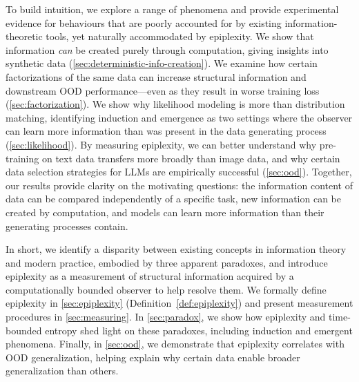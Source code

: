 \documentclass[twoside]{article}
\begin{document}
To build intuition, we explore a range of phenomena and provide experimental evidence for behaviours that are poorly accounted for by existing information-theoretic tools, yet naturally accommodated by epiplexity. We show that information \emph{can} be created purely through computation, giving insights into synthetic data (\autoref{sec:deterministic-info-creation}). We examine how certain factorizations of the same data can increase structural information and downstream OOD performance—even as they result in worse training loss (\autoref{sec:factorization}). We show why likelihood modeling is more than distribution matching, identifying induction and emergence as two settings where the observer can learn more information than was present in the data generating process (\autoref{sec:likelihood}). By measuring epiplexity, we can better understand why pre-training on text data transfers more broadly than image data, and why certain data selection strategies for LLMs are empirically successful (\autoref{sec:ood}). Together, our results provide clarity on the motivating questions: the information content of data can be compared independently of a specific task, new information can be created by computation, and models can learn more information than their generating processes contain.

%
%
%

In short, we identify a disparity between existing concepts in information theory and modern practice, embodied by three apparent paradoxes, and introduce epiplexity as a measurement of structural information acquired by a computationally bounded observer to help resolve them. We formally define epiplexity in \autoref{sec:epiplexity} (Definition~\ref{def:epiplexity}) and present measurement procedures in \autoref{sec:measuring}. In \autoref{sec:paradox}, we show how epiplexity and time-bounded entropy shed light on these paradoxes, including induction and emergent phenomena. Finally, in \autoref{sec:ood}, we demonstrate that epiplexity correlates with OOD generalization, helping explain why certain data enable broader generalization than others.

%

%

%




%
%
%
%

%
%
%
%
%
%
%
%
%
%
%
%

%
%

%
%
%
%
%
%
%
%
%
%
%
%
%

%
%
%
%
%
\end{document}
